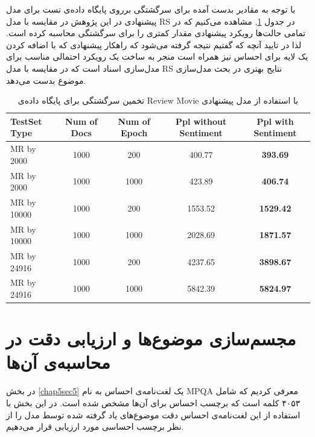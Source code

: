  با توجه به مقادير بدست آمده برای سرگشتگی برروی پایگاه داده‌ی تست برای مدل پیشنهادی در این پژوهش در مقايسه با مدل 
RS
در جدول 
\ref{chap5-tb2},
مشاهده می‌کنيم که در تمامی حالت‌ها رويکرد پيشنهادی مقدار کمتری را برای سرگشتگی محاسبه کرده است. لذا در تایید آنچه که گفتیم نتيجه گرفته 
می‌شود که راهکار پيشنهادی که با اضافه کردن يک لايه برای احساس نيز همراه است منجر به ساخت يک رويکرد احتمالی مناسب‌ برای مدل‌سازی اسناد 
است که در مقایسه با مدل 
RS
نتایج بهتری در بحث مدل‌سازی موضوع بدست می‌دهد.

\begin{table}[!t]
	\centering
	\begin{latin}
	\begin{tabular}{|l|c|c|c|c|}
		\hline
		TestSet Type & Num of Docs & Num of Epoch & Ppl without Sentiment & Ppl with Sentiment \\
		\hline
		MR by 2000 & 1000 & 200 & 400.77 & \textbf{393.69 }\\
		\hline
		MR by 2000 & 1000 & 1000 & 423.89 & \textbf{406.74} \\
		\hline
		MR by 10000 & 1000 & 200 & 1553.52 & \textbf{1529.42} \\
		\hline
		MR by 10000 & 1000 & 1000 & 2028.69 & \textbf{1871.57} \\
		\hline
		MR by 24916 & 1000 & 200 & 4237.65 & \textbf{3898.67}\\
		\hline
		MR by 24916 & 1000 & 1000 & 5842.39 & \textbf{5824.97}\\
		\hline
	\end{tabular}
	\end{latin}
	\caption{تخمین سرگشتگی برای پایگاه داده‌ی Review Movie با استفاده از مدل پیشنهادی}
	\label{chap5-tb2}
\end{table}

\section{مجسم‌سازی موضوع‌ها و ارزیابی دقت در محاسبه‌ی آن‌ها}
\label{chap5sec8}
در بخش
\ref{chap5sec5}
یک لغت‌نامه‌ی احساس به نام
MPQA
معرفی‌ کردیم که شامل ۴۰۵۳ کلمه است که برچسب احساس برای آن‌ها مشخص شده است. در این بخش با استفاده از این لغت‌نامه‌ی احساس دقت موضوع‌های یاد گرفته شده توسط مدل را از نظر برچسب احساسی مورد ارزیابی قرار می‌‌دهیم.

